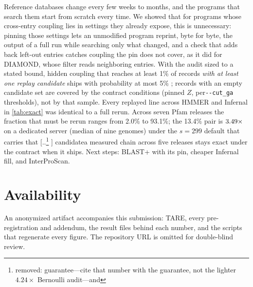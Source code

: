 \documentclass[letterpaper,twocolumn,10pt]{article}
\theoremstyle{definition}
\newcommand{\sys}{TARE\xspace}
\newcommand{\sys}{PARE\xspace}
\newcommand{\cutga}{\texttt{-{}-cut\_ga}\xspace}
\providecommand{\DIFadd}[1]{{\protect\color{blue} \sf #1}} %
\providecommand{\DIFdel}[1]{{\protect\color{red} [..\footnote{removed: #1} ]}} %
\providecommand{\DIFaddbegin}{} %
\providecommand{\DIFaddend}{} %
\providecommand{\DIFdelbegin}{} %
\providecommand{\DIFdelend}{} %
\providecommand{\DIFscaledelfig}{0.5}
\newlength{\DIFdelgraphicswidth} %
\newlength{\DIFdelgraphicsheight} %
\providecommand{\DIFaddincludegraphics}[2][]{{\color{blue}\fbox{\DIFOincludegraphics[#1]{#2}}}} %
\providecommand{\DIFdelincludegraphics}[2][]{%
\sbox{\DIFdelgraphicsbox}{\DIFOincludegraphics[#1]{#2}}%
\settoboxwidth{\DIFdelgraphicswidth}{\DIFdelgraphicsbox} %
\settoboxtotalheight{\DIFdelgraphicsheight}{\DIFdelgraphicsbox} %
\scalebox{\DIFscaledelfig}{%
\parbox[b]{\DIFdelgraphicswidth}{\usebox{\DIFdelgraphicsbox}\\[-\baselineskip] \rule{\DIFdelgraphicswidth}{0em}}\llap{\resizebox{\DIFdelgraphicswidth}{\DIFdelgraphicsheight}{%
\setlength{\unitlength}{\DIFdelgraphicswidth}%
\begin{picture}(1,1)%
\thicklines\linethickness{2pt} %
{\color[rgb]{1,0,0}\put(0,0){\framebox(1,1){}}}%
{\color[rgb]{1,0,0}\put(0,0){\line( 1,1){1}}}%
{\color[rgb]{1,0,0}\put(0,1){\line(1,-1){1}}}%
\end{picture}%
}\hspace*{3pt}}} %
} %
\DeclareRobustCommand{\DIFaddbegin}{\DIFOaddbegin \let\includegraphics\DIFaddincludegraphics} %
\DeclareRobustCommand{\DIFaddend}{\DIFOaddend \let\includegraphics\DIFOincludegraphics} %
\DeclareRobustCommand{\DIFdelbegin}{\DIFOdelbegin \let\includegraphics\DIFdelincludegraphics} %
\DeclareRobustCommand{\DIFdelend}{\DIFOaddend \let\includegraphics\DIFOincludegraphics} %
\begin{document}
Reference databases change every few weeks to months, and the programs that search them start from scratch every time. We
showed that for programs whose cross\nobreakdash-entry coupling lies in settings they already expose, this is unnecessary: pinning
those settings lets an unmodified program reprint, byte for byte, the output of a full run while searching only what
changed, and a check that adds back left\nobreakdash-out entries catches coupling the pin does not cover, as it did for DIAMOND,
whose filter reads neighboring entries. With the audit sized to a stated bound, hidden coupling that reaches at least 1\% of records \DIFaddbegin \DIFadd{\emph{with at least one replay candidate} }\DIFaddend ships with probability at most 5\%\DIFaddbegin \DIFadd{; records with an empty candidate set are covered by the contract conditions (pinned $Z$, per}\nobreakdash\DIFadd{-family }\cutga \DIFadd{thresholds), not by that sample}\DIFaddend . Every replayed line across HMMER and Infernal in \cref{tab:exact} was identical to a full rerun. Across seven Pfam releases the fraction that must be rerun ranges from 2.0\% to 93.1\%; the 13.4\% pair is $3.49\times$ on a dedicated server (median of nine genomes) under the $s{=}299$ default that carries that \DIFdelbegin \DIFdel{guarantee---cite that number with the guarantee, not the lighter $4.24\times$ Bernoulli audit---and }\DIFdelend \DIFaddbegin \DIFadd{candidate}\nobreakdash\DIFadd{-population guarantee, and }\DIFaddend a measured chain across five releases stays exact \DIFaddbegin \DIFadd{under the contract }\DIFaddend when it ships. Next steps: BLAST+ with its pin, cheaper Infernal fill, and InterProScan.

\section*{Availability}
An anonymized artifact accompanies this submission: \sys, every pre\nobreakdash-registration and addendum, the result files behind each number, and the scripts that regenerate every figure. The repository URL is omitted for double\nobreakdash-blind review.



\end{document}
